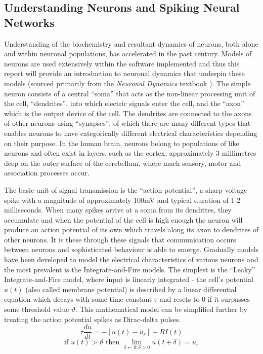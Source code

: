 \documentclass[11pt, twocolumn]{article}
\begin{document}
\subsection*{Understanding Neurons and Spiking Neural Networks}
Understanding of the biochemistry and resultant dynamics of neurons, both alone and within neuronal populations, has accelerated in the past century. Models of neurons are used extensively within the software implemented and thus this report will provide an introduction to neuronal dynamics that underpin these models (sourced primarily from the \textit{Neuronal Dynamics} textbook \cite{gerstner2014neuronal}). The simple neuron consists of a central ``soma'' that acts as the non-linear processing unit of the cell, ``dendrites'', into which electric signals enter the cell, and the ``axon'' which is the output device of the cell. The dendrites are connected to the axons of other neurons using ``synapses'', of which there are many different types that enables neurons to have categorically different electrical characteristics depending on their purpose. In the human brain, neurons belong to populations of like neurons and often exist in layers, such as the cortex, approximately 3 millimetres deep on the outer surface of the cerebellum, where much sensory, motor and association processes occur.

The basic unit of signal transmission is the ``action potential'', a sharp voltage spike with a magnitude of approximately 100mV and typical duration of 1-2 milliseconds. When many spikes arrive at a soma from its dendrites, they accumulate and when the potential of the cell is high enough the neuron will produce an action potential of its own which travels along its axon to dendrites of other neurons. It is these through these signals that communication occurs between neurons and sophisticated behaviour is able to emerge. Gradually models have been developed to model the electrical characteristics of various neurons and the most prevalent is the Integrate-and-Fire models. The simplest is the ``Leaky'' Integrate-and-Fire model, where input is linearly integrated - the cell's potential $u(t)$ (also called membrane potential) is described by a linear differential equation which decays with some time constant $\tau$ and resets to 0 if it surpasses some threshold value $\vartheta$. This mathematical model can be simplified further by treating the action potential spikes as Dirac-delta pulses.
\begin{equation}
	\tau\frac{du}{dt} = -[u(t)-u_r]+RI(t)
	\label{eqn:leaky_integrate_and_fire_differential}
\end{equation}
\begin{equation}
	\text{if } u(t) > \vartheta \text{ then } \lim\limits_{\delta\leftarrow0;\delta>0}u(t+\delta) = u_r
	\label{eqn:leaky_integrate_and_fire_threshold}
\end{equation}
\end{document}
